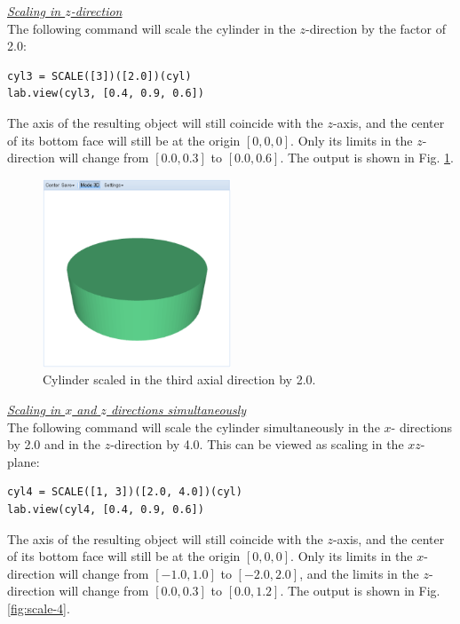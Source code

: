 \documentclass{article}
\begin{document}
\noindent
\underline{\em Scaling in $z$-direction}\\

The following command will 
scale the cylinder in the $z$-direction by the factor of 2.0: 

\begin{verbatim}
cyl3 = SCALE([3])([2.0])(cyl)
lab.view(cyl3, [0.4, 0.9, 0.6])
\end{verbatim}
The axis of the resulting object will still
coincide with the $z$-axis, and the center of its bottom face will
still be at the origin $[0, 0, 0]$. Only its limits in the $z$-direction will change 
from $[0.0, 0.3]$ to $[0.0, 0.6]$. The output is shown in Fig. \ref{fig:scale-3}.

\newpage

\begin{figure}[!ht]
\begin{center}
\includegraphics[width=0.5\textwidth]{img/scale-3.png}
\end{center}
\vspace{-2mm}
\caption{Cylinder scaled in the third axial direction by 2.0.}
\label{fig:scale-3}
\end{figure}

\noindent
\underline{\em Scaling in $x$ and $z$ directions simultaneously}\\

The following command will 
scale the cylinder simultaneously in the $x$- directions by 2.0 and in the $z$-direction by 4.0.
This can be viewed as scaling in the $xz$-plane:

\begin{verbatim}
cyl4 = SCALE([1, 3])([2.0, 4.0])(cyl)
lab.view(cyl4, [0.4, 0.9, 0.6])
\end{verbatim}
The axis of the resulting object will still
coincide with the $z$-axis, and the center of its bottom face will
still be at the origin $[0, 0, 0]$. Only its limits in the $x$-direction 
will change from $[-1.0, 1.0]$ to $[-2.0, 2.0]$, and the limits in the 
$z$-direction will change 
from $[0.0, 0.3]$ to $[0.0, 1.2]$. The output is shown in Fig. \ref{fig:scale-4}.
\end{document}
